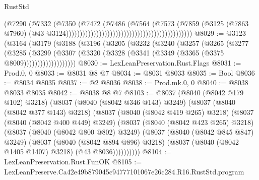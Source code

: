 \begin{lexlean}{RustStd}
\begin{coremodule}
                                                                            (@7290
                                                                              (@7332
                                                                                (@7350
                                                                                  (@7472
                                                                                    (@7486
                                                                                      (@7564
                                                                                        (@7573
                                                                                          (@7859
                                                                                            (@3125
                                                                                              (@7863
                                                                                                @7960)
                                                                                              (@43
                                                                                                @3124))))))))))))))))))))))))))))))))))))))))))))))
@8029 := @3123
    (@3164
      (@3179
        (@3188
          (@3196
            (@3205
              (@3232
                (@3240
                  (@3257
                    (@3265
                      (@3277
                        (@3285
                          (@3299
                            (@3307
                              (@3320 (@3328 (@3341 (@3349 (@3365 (@3375 @8009)))))))))))))))))))
@8030 := LexLeanPreservation.Rust.Flags
@8031 := Prod.{0, 0}
@8033 := @8031 @8 @7
@8034 := @8031 @8033
@8035 := Bool
@8036 := @8034 @8035
@8037 := @2 @8036
@8038 := Prod.mk.{0, 0}
@8040 := @8038 @8033 @8035
@8042 := @8038 @8 @7
@8103 := @8037
    (@8040 (@8042 @179 @102) @3218)
    (@8037
      (@8040 (@8042 @346 @143) @3249)
      (@8037
        (@8040 (@8042 @377 @143) @3218)
        (@8037
          (@8040 (@8042 @419 @265) @3218)
          (@8037
            (@8040 (@8042 @400 @449) @3249)
            (@8037
              (@8040 (@8042 @423 @265) @3218)
              (@8037
                (@8040 (@8042 @800 @802) @3249)
                (@8037
                  (@8040 (@8042 @845 @847) @3249)
                  (@8037
                    (@8040 (@8042 @894 @896) @3218)
                    (@8037 (@8040 (@8042 @1405 @1407) @3218) (@43 @8036))))))))))
@8104 := LexLeanPreservation.Rust.FunOK
@8105 := LexLeanPreserve.Ca42e49b879045c94777101067e26c284.R16.RustStd.program

\end{coremodule}
\end{lexlean}
